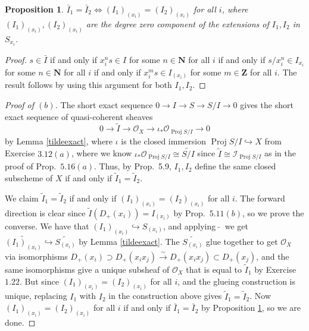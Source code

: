\documentclass[10pt]{article}
\newtheorem{proposition}{Proposition}
\theoremstyle{definition}
\theoremstyle{remark}
\numberwithin{equation}{section}
\numberwithin{figure}{subsubsection}
\DeclareMathOperator{\Proj}{Proj}
\newcommand{\II}{\mathscr{I}}
\newcommand{\OO}{\mathcal{O}}
\newcommand{\isoto}{\overset{\sim}{\to}}
\begin{document}
\begin{proposition}\label{projaffideal}
  $\bar{I}_1 = \bar{I}_2 \iff (I_1)_{(x_i)} = (I_2)_{(x_i)}$ for all $i$, where $(I_1)_{(x_i)},(I_2)_{(x_i)}$ are the degree zero component of the extensions of $I_1,I_2$ in $S_{x_i}$.
\end{proposition}
\begin{proof}
  $s \in \bar{I}$ if and only if $x_i^ns \in I$ for some $n \in \mathbf{N}$ for all $i$ if and only if $s/x_i^{n} \in I_{x_i}$ for some $n \in \mathbf{N}$ for all $i$ if and only if $x_i^ms \in I_{(x_i)}$ for some $m \in \mathbf{Z}$ for all $i$. The result follows by using this argument for both $I_1,I_2$.
\end{proof}
\begin{proof}[Proof of $(b)$]
  The short exact sequence $0 \to I \to S \to S/I \to 0$ gives the short exact sequence of quasi-coherent sheaves
  \begin{equation*}
    0 \longrightarrow \tilde{I} \longrightarrow \OO_X \longrightarrow \iota_*\OO_{\Proj S/I} \longrightarrow 0
  \end{equation*}
  by Lemma \ref{tildeexact}, where $\iota$ is the closed immersion $\Proj S/I
  \hookrightarrow X$ from Exercise $3.12(a)$, where we know $\iota_*\OO_{\Proj S/I} \cong \widetilde{S/I}$ since $\tilde{I} \cong \II_{\Proj S/I}$ as in the proof of Prop.~$5.16(a)$. Thus, by Prop.~5.9, $I_1,I_2$ define the same closed subscheme of $X$ if and only if $\tilde{I}_1 = \tilde{I}_2$.
  \par We claim $\tilde{I}_1 = \tilde{I}_2$ if and only if $(I_1)_{(x_i)} =
  (I_2)_{(x_i)}$ for all $i$. The forward direction is clear since
  $\tilde{I}(D_+(x_i)) = I_{(x_i)}$ by Prop.~$5.11(b)$, so we prove the
  converse. We have that $(I_1)_{(x_i)} \hookrightarrow S_{(x_i)}$, and applying
  $\:\tilde{}\:$ we get $\widetilde{(I_1)_{(x_i)}} \hookrightarrow
  \widetilde{S_{(x_i)}}$ by Lemma \ref{tildeexact}. The $\widetilde{S_{(x_i)}}$
  glue together to get $\OO_X$ via isomorphisms $D_+(x_i) \supset D_+(x_ix_j)
  \isoto D_+(x_ix_j) \subset D_+(x_j)$, and the same isomorphisms give a unique
  subsheaf of $\OO_X$ that is equal to $\tilde{I}_1$ by Exercise $1.22$. But since $(I_1)_{(x_i)} = (I_2)_{(x_i)}$ for all $i$, and the glueing construction is unique, replacing $I_1$ with $I_2$ in the construction above gives $\tilde{I}_1 = \tilde{I}_2$. Now $(I_1)_{(x_i)} = (I_2)_{(x_i)}$ for all $i$ if and only if $\bar{I}_1 = \bar{I}_2$ by Proposition \ref{projaffideal}, so we are done.
\end{proof}
\end{document}
